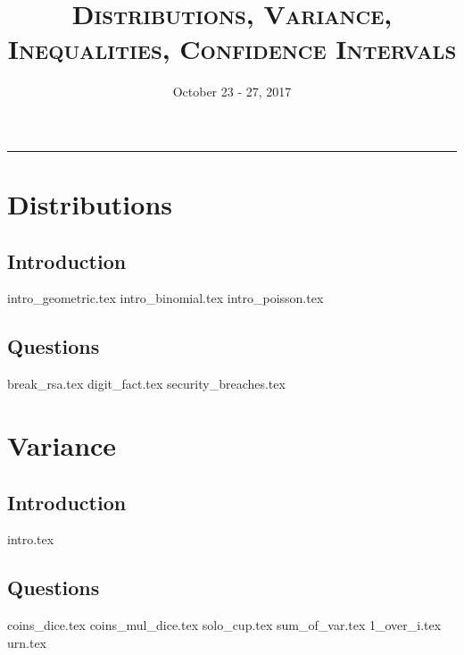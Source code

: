 \documentclass{exam}
\title{\textsc{Distributions, Variance, Inequalities, Confidence Intervals}}
\date{October 23 - 27, 2017}
\begin{document}
\maketitle
\rule{\textwidth}{0.15em}
\fontsize{12}{15}\selectfont
\thispagestyle{empty}

\section{Distributions}
\subsection{Introduction}
{intro_geometric.tex}
{intro_binomial.tex}
{intro_poisson.tex}
\subsection{Questions}
\begin{questions}
{break_rsa.tex}
\clearpage
{digit_fact.tex}
{security_breaches.tex}
\end{questions}

\section{Variance}
\subsection{Introduction}
{intro.tex}
\subsection{Questions}
\begin{questions}
{coins_dice.tex}
{coins_mul_dice.tex}
{solo_cup.tex}
\clearpage
{sum_of_var.tex}
{1_over_i.tex}
{urn.tex}
\end{questions}
\end{document}
